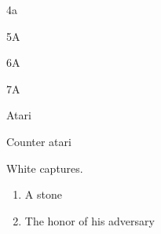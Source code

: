 \begin{frame}

4a %
\clearintersection{}
\end{frame}
\begin{frame}

5A
\clearintersection{}
\end{frame}
\begin{frame}

6A
\clearintersection{}
\end{frame}
\begin{frame}

7A
\clearintersection{}
\end{frame}
\begin{frame}

Atari
\clearintersection{}
\end{frame}
\begin{frame}

Counter atari
\clearintersection{}
\end{frame}
\begin{frame}

White captures.
\begin{enumerate}
	\item A stone
	\item The honor of his adversary
\end{enumerate}
\end{frame}
